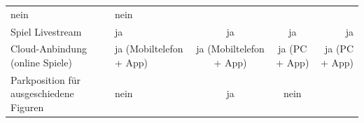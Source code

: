 \begin{longtable}[]{@{}llccr@{}}
\begin{minipage}[t]{0.15\columnwidth}
nein\strut
\end{minipage} & \begin{minipage}[t]{0.13\columnwidth}\raggedleft
nein\strut
\end{minipage}\tabularnewline
\begin{minipage}[t]{0.19\columnwidth}\raggedright
Spiel Livestream\strut
\end{minipage} & \begin{minipage}[t]{0.19\columnwidth}\raggedright
ja\strut
\end{minipage} & \begin{minipage}[t]{0.20\columnwidth}\centering
ja\strut
\end{minipage} & \begin{minipage}[t]{0.15\columnwidth}\centering
ja\strut
\end{minipage} & \begin{minipage}[t]{0.13\columnwidth}\raggedleft
ja\strut
\end{minipage}\tabularnewline
\begin{minipage}[t]{0.19\columnwidth}\raggedright
Cloud-Anbindung (online Spiele)\strut
\end{minipage} & \begin{minipage}[t]{0.19\columnwidth}\raggedright
ja (Mobiltelefon + App)\strut
\end{minipage} & \begin{minipage}[t]{0.20\columnwidth}\centering
ja (Mobiltelefon + App)\strut
\end{minipage} & \begin{minipage}[t]{0.15\columnwidth}\centering
ja (PC + App)\strut
\end{minipage} & \begin{minipage}[t]{0.13\columnwidth}\raggedleft
ja (PC + App)\strut
\end{minipage}\tabularnewline
\begin{minipage}[t]{0.19\columnwidth}\raggedright
Parkposition für ausgeschiedene Figuren\strut
\end{minipage} & \begin{minipage}[t]{0.19\columnwidth}\raggedright
nein\strut
\end{minipage} & \begin{minipage}[t]{0.20\columnwidth}\centering
ja\strut
\end{minipage} & \begin{minipage}[t]{0.15\columnwidth}\centering
nein\strut
\end{minipage} & \begin{minipage}[t]{0.13\columnwidth}\raggedleft

\end{minipage}
\end{longtable}
